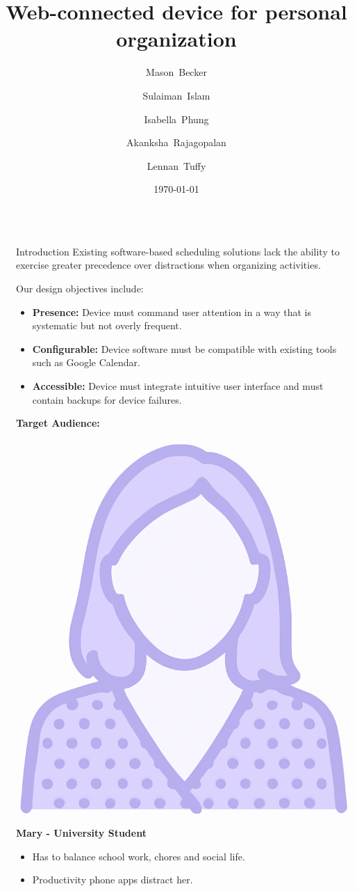 \documentclass[final]{beamer}
\title{Web-connected device for personal organization}
\author{
  Mason~Becker
  \and
  Sulaiman~Islam
  \and
  Isabella~Phung
  \and
  Akanksha~Rajagopalan
  \and
  Lennan~Tuffy
}
\institute[UC Santa Cruz]{CSE 123 - Supervised by Prof. David Harrison and Charlie Alders}
\date{\today}
\newlength{\sepwidth}
\newlength{\colwidth}
\newcommand{\separatorcolumn}{\begin{column}{\sepwidth}\end{column}}
\begin{document}
\begin{frame}[t]
  \begin{columns}[t]
    \separatorcolumn

    \begin{column}{\colwidth}

      \begin{block}{Introduction}
        Existing software-based scheduling solutions lack the ability to exercise 
        greater precedence over distractions 
        when organizing activities.

        Our design objectives include:
        \begin{itemize}
            \item \textbf{Presence:} Device must command user attention in a way that is systematic but not overly frequent.
            \item \textbf{Configurable:} Device software must be compatible with existing tools such as Google Calendar.
            \item \textbf{Accessible:} Device must integrate intuitive user interface and must contain backups for device failures. 
        \end{itemize}
       
        \textbf{Target Audience:}
        \newline
        \newline
        \noindent\begin{minipage}{0.3\linewidth}
        \centering
        \includegraphics[width=0.5\linewidth]{Camillia.png}
        \end{minipage}
        \hfill
        \begin{minipage}{0.7\linewidth}
          \textbf{Mary - University Student}
        \begin{itemize}
            \item Has to balance school work, chores and social life.
            \item Productivity phone apps distract her.
        \end{itemize}
        \end{minipage}


\end{block}
\end{column}
\end{columns}
\end{frame}
\end{document}
